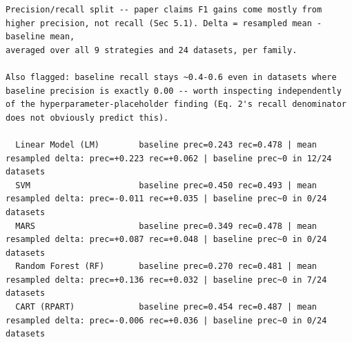 \begingroup
{}
\label{tab:exp002_cmp_cmp_precision_recall}
\tiny
\begin{verbatim}
Precision/recall split -- paper claims F1 gains come mostly from
higher precision, not recall (Sec 5.1). Delta = resampled mean - baseline mean,
averaged over all 9 strategies and 24 datasets, per family.

Also flagged: baseline recall stays ~0.4-0.6 even in datasets where
baseline precision is exactly 0.00 -- worth inspecting independently
of the hyperparameter-placeholder finding (Eq. 2's recall denominator
does not obviously predict this).

  Linear Model (LM)        baseline prec=0.243 rec=0.478 | mean resampled delta: prec=+0.223 rec=+0.062 | baseline prec~0 in 12/24 datasets
  SVM                      baseline prec=0.450 rec=0.493 | mean resampled delta: prec=-0.011 rec=+0.035 | baseline prec~0 in 0/24 datasets
  MARS                     baseline prec=0.349 rec=0.478 | mean resampled delta: prec=+0.087 rec=+0.048 | baseline prec~0 in 0/24 datasets
  Random Forest (RF)       baseline prec=0.270 rec=0.481 | mean resampled delta: prec=+0.136 rec=+0.032 | baseline prec~0 in 7/24 datasets
  CART (RPART)             baseline prec=0.454 rec=0.487 | mean resampled delta: prec=-0.006 rec=+0.036 | baseline prec~0 in 0/24 datasets
\end{verbatim}
\endgroup
